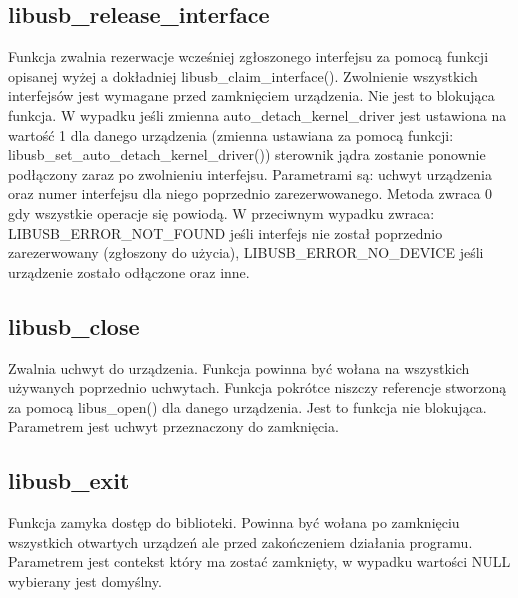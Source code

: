 \documentclass{BscUS}
\begin{document}
\subsection{libusb\_release\_interface}
\noindent Funkcja zwalnia rezerwacje wcześniej zgłoszonego interfejsu za pomocą funkcji opisanej wyżej a dokładniej libusb\_claim\_interface().
Zwolnienie wszystkich interfejsów jest wymagane przed zamknięciem urządzenia.
Nie jest to blokująca funkcja.
W wypadku jeśli zmienna auto\_detach\_kernel\_driver jest ustawiona na wartość 1 dla danego urządzenia (zmienna ustawiana za pomocą funkcji: libusb\_set\_auto\_detach\_kernel\_driver()) sterownik jądra zostanie ponownie podłączony zaraz po zwolnieniu interfejsu.
Parametrami są: uchwyt urządzenia oraz numer interfejsu dla niego poprzednio zarezerwowanego.
\newline
Metoda zwraca 0 gdy wszystkie operacje się powiodą.
W przeciwnym wypadku zwraca: LIBUSB\_ERROR\_NOT\_FOUND jeśli interfejs nie został poprzednio zarezerwowany (zgłoszony do użycia), LIBUSB\_ERROR\_NO\_DEVICE jeśli urządzenie zostało odłączone oraz inne.
\subsection{libusb\_close}
\noindent Zwalnia uchwyt do urządzenia.
Funkcja powinna być wołana na wszystkich używanych poprzednio uchwytach.
Funkcja pokrótce niszczy referencje stworzoną za pomocą libus\_open() dla danego urządzenia.
Jest to funkcja nie blokująca.
Parametrem jest uchwyt przeznaczony do zamknięcia.

\subsection{libusb\_exit}
\noindent Funkcja zamyka dostęp do biblioteki.
Powinna być wołana po zamknięciu wszystkich otwartych urządzeń ale przed zakończeniem działania programu.
Parametrem jest contekst który ma zostać zamknięty, w wypadku wartości NULL wybierany jest domyślny.
\end{document}
